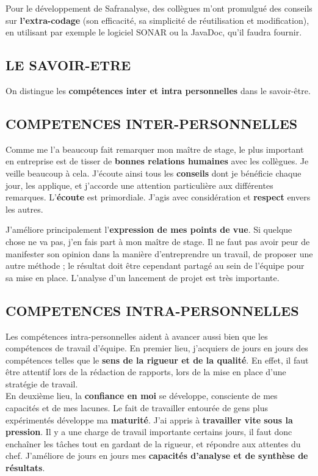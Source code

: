Pour le développement de Safranalyse, des collègues m’ont promulgué des conseils sur \textbf{l’extra-codage} (son efficacité, sa simplicité de réutilisation et modification), en utilisant par exemple le logiciel SONAR ou la JavaDoc, qu'il faudra fournir.\\

 \subsection{LE SAVOIR-ETRE}
 On distingue les \textbf{compétences inter et intra personnelles} dans le savoir-être.
 
 \subsection{COMPETENCES INTER-PERSONNELLES}
 
Comme me l’a beaucoup fait remarquer mon maître de stage, le plus important en entreprise est de tisser de \textbf{bonnes relations humaines} avec les collègues. Je veille beaucoup à cela. J’écoute ainsi tous les \textbf{conseils} dont je bénéficie chaque jour, les applique, et j’accorde une attention particulière aux différentes remarques. L’\textbf{écoute} est primordiale. J’agis avec considération et \textbf{respect} envers les autres. 

J’améliore principalement l’\textbf{expression de mes points de vue}. Si quelque chose ne va pas, j’en fais part à mon maître de stage. Il ne faut pas avoir peur de manifester son opinion dans la manière d’entreprendre un travail, de proposer une autre méthode ; le résultat doit être cependant partagé au sein de l’équipe pour sa mise en place. L’analyse d’un lancement de projet est très importante.\\

 \subsection{COMPETENCES INTRA-PERSONNELLES}
Les compétences intra-personnelles aident à avancer aussi bien que les compétences de travail d’équipe. En premier lieu, j’acquiers de jours en jours des compétences telles que le \textbf{sens de la rigueur et de la qualité}. En effet, il faut être attentif lors de la rédaction de rapports, lors de la mise en place d’une stratégie de travail.\\

En deuxième lieu, la \textbf{confiance en moi} se développe, consciente de mes capacités et de mes lacunes. Le fait de travailler entourée de gens plus expérimentés développe ma \textbf{maturité}. J’ai appris à \textbf{travailler vite sous la pression}. Il y a une charge de travail importante certains jours, il faut donc enchaîner les tâches tout en gardant de la rigueur, et répondre aux attentes du chef. J’améliore de jours en jours mes \textbf{capacités d’analyse et de synthèse de résultats}.

